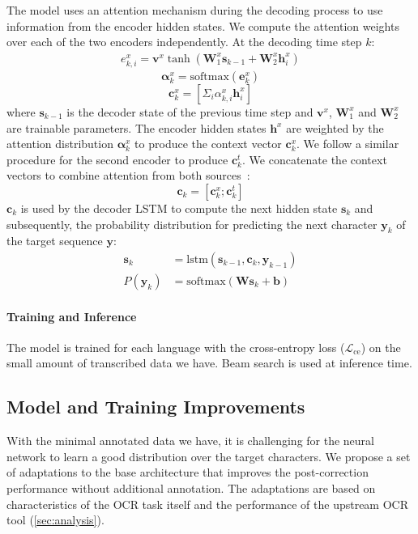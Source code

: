 The model uses an attention mechanism during the decoding process to use information from the encoder hidden states. We compute the attention weights over each of the two encoders independently. At the decoding time step $k$:
\begin{align}
e^x_{k,i}=\mathbf{v}^x \tanh\left(\mathbf{W}_1^x \mathbf{s}_{k-1} + \mathbf{W}_2^x \mathbf{h}^x_i\right)
\label{eq:attn}
\end{align}
$$\boldsymbol{\alpha}_k^x = \mathrm{softmax}\left(\mathbf{e}_k^x\right)$$
$$\mathbf{c}^x_k = \left[\Sigma_i \alpha^x_{k,i} \mathbf{h}^x_i\right]$$
\noindent
where $\mathbf{s}_{k-1}$ is the decoder state of the previous time step and $\mathbf{v}^x$, $\mathbf{W}_1^x$ and $\mathbf{W}_2^x$ are trainable parameters. The encoder hidden states $\mathbf{h}^x$ are weighted by the attention distribution $\boldsymbol{\alpha}^x_k$ to produce the context vector $\mathbf{c}^x_k$. We follow a similar procedure for the second encoder to produce $\mathbf{c}^t_k$.
We concatenate the context vectors to combine attention from both sources~\cite{zoph-knight-2016-multi}:
$$\mathbf{c}_k=\left[\mathbf{c}_k^x;\mathbf{c}_k^t\right]$$
$\mathbf{c}_k$ is used by the decoder LSTM to compute the next hidden state $\mathbf{s}_k$ and subsequently, the probability distribution for predicting the next character $\mathbf{y}_k$ of the target sequence $\boldsymbol{y}$:
\begin{align} 
\mathbf{s}_k &= \mathrm{lstm}\left(\mathbf{s}_{k-1}, \mathbf{c}_k, \mathbf{y}_{k-1}\right)\\
P\left(\mathbf{y}_k\right) &= \mathrm{softmax}\left(\mathbf{W}\mathbf{s}_k + \mathbf{b}\right)
\label{eq:decoder}
\end{align}

\paragraph{Training and Inference} The model is trained for each language with the cross-entropy loss ($\mathcal{L}_\mathrm{ce}$) on the small amount of transcribed data we have. Beam search is used at inference time.


\subsection{Model and Training Improvements}
\label{sec:recipe1}

With the minimal annotated data we have, it is challenging for the neural network to learn a good distribution over the target characters. We propose a set of adaptations to the base architecture that improves the post-correction performance without additional annotation. The adaptations are based on characteristics of the OCR task itself and the performance of the upstream OCR tool (\autoref{sec:analysis}).

